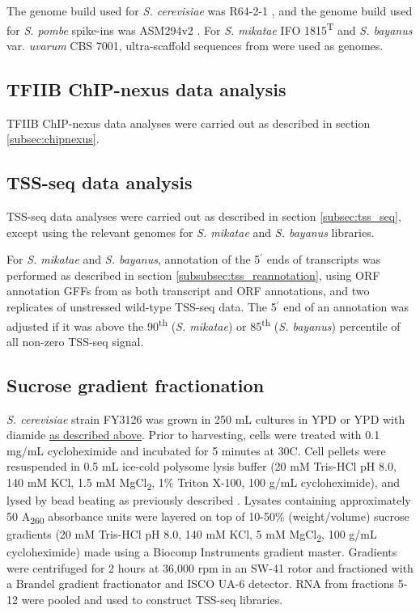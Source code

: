The genome build used for \textit{S. cerevisiae} was R64-2-1 \citep{engel2014}, and the genome build used for \textit{S. pombe} spike-ins was ASM294v2 \citep{wood2002}.
For \textit{S. mikatae }IFO 1815\textsuperscript{T} and \textit{S. bayanus} var. \textit{uvarum }CBS 7001, ultra-scaffold sequences from \citet{scannell11} were used as genomes.

\subsection{TFIIB ChIP-nexus data analysis}

TFIIB ChIP-nexus data analyses were carried out as described in section \ref{subsec:chipnexus}.

\subsection{TSS-seq data analysis}

TSS-seq data analyses were carried out as described in section \ref{subsec:tss_seq}, except using the relevant genomes for \textit{S. mikatae} and \textit{S. bayanus} libraries.

For \textit{S. mikatae} and \textit{S. bayanus}, annotation of the 5$^\prime$ ends of transcripts was performed as described in section \ref{subsubsec:tss_reannotation}, using ORF annotation GFFs from \citet{scannell11} as both transcript and ORF annotations, and two replicates of unstressed wild-type TSS-seq data.
The 5$^\prime$ end of an annotation was adjusted if it was above the 90\textsuperscript{th} (\textit{S. mikatae}) or 85\textsuperscript{th} (\textit{S. bayanus}) percentile of all non-zero TSS-seq signal.

\subsection{Sucrose gradient fractionation}

\textit{S. cerevisiae} strain FY3126 was grown in 250 mL cultures in YPD or YPD with diamide \hyperref[subsec:stress_growth_conditions]{as described above}.
Prior to harvesting, cells were treated with 0.1 mg/mL cycloheximide and incubated for 5 minutes at 30\textdegree C.
Cell pellets were resuspended in 0.5 mL ice-cold polysome lysis buffer (20 mM Tris-HCl pH 8.0, 140 mM KCl, 1.5 mM MgCl\textsubscript{2}, 1\% Triton X-100, 100 \textmu g/mL cycloheximide), and lysed by bead beating as previously described \citep{degennaro2013}.
Lysates containing approximately 50 A\textsubscript{260} absorbance units were layered on top of 10-50\% (weight/volume) sucrose gradients (20 mM Tris-HCl pH 8.0, 140 mM KCl, 5 mM MgCl\textsubscript{2}, 100 \textmu g/mL cycloheximide) made using a Biocomp Instruments gradient master.
Gradients were centrifuged for 2 hours at 36,000 rpm in an SW-41 rotor and fractioned with a Brandel gradient fractionator and ISCO UA-6 detector.
RNA from fractions 5-12 were pooled and used to construct TSS-seq libraries.

